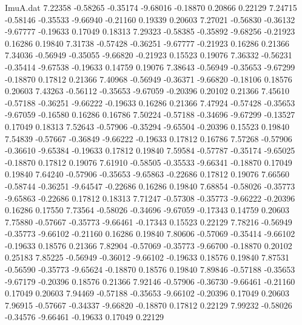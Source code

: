 \begin{filecontents}{ImuA.dat}
   7.22358   -0.58265   -0.35174   -9.68016   -0.18870    0.20866    0.22129
   7.24715   -0.58146   -0.35533   -9.66940   -0.21160    0.19339    0.20603
   7.27021   -0.56830   -0.36132   -9.67777   -0.19633    0.17049    0.18313
   7.29323   -0.58385   -0.35892   -9.68256   -0.21923    0.16286    0.19840
   7.31738   -0.57428   -0.36251   -9.67777   -0.21923    0.16286    0.21366
   7.34036   -0.56949   -0.35055   -9.66820   -0.21923    0.15523    0.19076
   7.36332   -0.56231   -0.35414   -9.67538   -0.19633    0.14759    0.19076
   7.38643   -0.56949   -0.35653   -9.67299   -0.18870    0.17812    0.21366
   7.40968   -0.56949   -0.36371   -9.66820   -0.18106    0.18576    0.20603
   7.43263   -0.56112   -0.35653   -9.67059   -0.20396    0.20102    0.21366
   7.45610   -0.57188   -0.36251   -9.66222   -0.19633    0.16286    0.21366
   7.47924   -0.57428   -0.35653   -9.67059   -0.16580    0.16286    0.16786
   7.50224   -0.57188   -0.34696   -9.67299   -0.13527    0.17049    0.18313
   7.52643   -0.57906   -0.35294   -9.65504   -0.20396    0.15523    0.19840
   7.54839   -0.57667   -0.36849   -9.66222   -0.19633    0.17812    0.16786
   7.57268   -0.57906   -0.36610   -9.65384   -0.19633    0.17812    0.19840
   7.59584   -0.57787   -0.35174   -9.65025   -0.18870    0.17812    0.19076
   7.61910   -0.58505   -0.35533   -9.66341   -0.18870    0.17049    0.19840
   7.64240   -0.57906   -0.35653   -9.65863   -0.22686    0.17812    0.19076
   7.66560   -0.58744   -0.36251   -9.64547   -0.22686    0.16286    0.19840
   7.68854   -0.58026   -0.35773   -9.65863   -0.22686    0.17812    0.18313
   7.71247   -0.57308   -0.35773   -9.66222   -0.20396    0.16286    0.17550
   7.73564   -0.58026   -0.34696   -9.67059   -0.17343    0.14759    0.20603
   7.75880   -0.57667   -0.35773   -9.66461   -0.17343    0.15523    0.22129
   7.78216   -0.56949   -0.35773   -9.66102   -0.21160    0.16286    0.19840
   7.80606   -0.57069   -0.35414   -9.66102   -0.19633    0.18576    0.21366
   7.82904   -0.57069   -0.35773   -9.66700   -0.18870    0.20102    0.25183
   7.85225   -0.56949   -0.36012   -9.66102   -0.19633    0.18576    0.19840
   7.87531   -0.56590   -0.35773   -9.65624   -0.18870    0.18576    0.19840
   7.89846   -0.57188   -0.35653   -9.67179   -0.20396    0.18576    0.21366
   7.92146   -0.57906   -0.36730   -9.66461   -0.21160    0.17049    0.20603
   7.94469   -0.57188   -0.35653   -9.66102   -0.20396    0.17049    0.20603
   7.96915   -0.57667   -0.34337   -9.66820   -0.18870    0.17812    0.22129
   7.99232   -0.58026   -0.34576   -9.66461   -0.19633    0.17049    0.22129

\end{filecontents}
